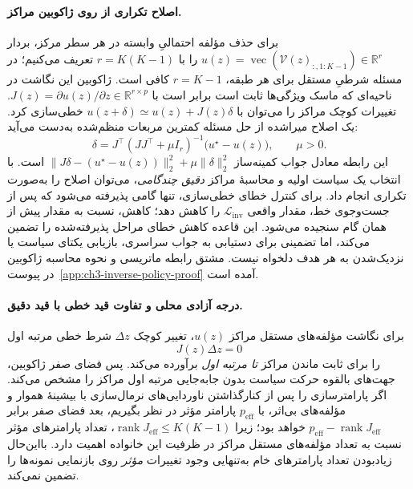 \paragraph{اصلاح تکراری از روی ژاکوبین مراکز.}
برای حذف مؤلفه احتمالیِ وابسته در هر سطر مرکز، بردار
$u(z)=\operatorname{vec}(\mathcal V(z)_{:,1:K-1})\in\mathbb R^r$
را با $r=K(K-1)$ تعریف می‌کنیم؛ در مسئله شرطیِ مستقل برای هر طبقه، $r=K-1$ کافی است. ژاکوبین این نگاشت در ناحیه‌ای که ماسک ویژگی‌ها ثابت است برابر است با
$J(z)=\partial u(z)/\partial z\in\mathbb R^{r\times p}$.
تغییرات کوچک مراکز را می‌توان با
$u(z+\delta)\simeq u(z)+J(z)\delta$
خطی‌سازی کرد. یک اصلاح میراشده از حل مسئله کمترین مربعات منظم‌شده به‌دست می‌آید:
\begin{equation}\label{cmp:eq:ch3-inverse-GN}
\boxed{\delta=
J^\top(JJ^\top+\mu I_r)^{-1}
\bigl(u^\star-u(z)\bigr),\qquad \mu>0.}
\end{equation}
این رابطه معادل جواب کمینه‌ساز
$\|J\delta-(u^\star-u(z))\|_2^2+\mu\|\delta\|_2^2$
است. با انتخاب یک سیاست اولیه و محاسبهٔ مراکز \emph{دقیق چندگامی}، می‌توان اصلاح را به‌صورت تکراری انجام داد. برای کنترل خطای خطی‌سازی، تنها گامی پذیرفته می‌شود که پس از جست‌وجوی خط، مقدار واقعی $\mathcal L_{\mathrm{inv}}$ را کاهش دهد؛ کاهش، نسبت به مقدار پیش از همان گام سنجیده می‌شود. این قاعده کاهش خطای مراحل پذیرفته‌شده را تضمین می‌کند، اما تضمینی برای دستیابی به جواب سراسری، بازیابی یکتای سیاست یا نزدیک‌شدن به هر هدف دلخواه نیست. مشتق رابطه ماتریسی و نحوه محاسبه ژاکوبین در پیوست~\ref{app:ch3-inverse-policy-proof} آمده است.


\paragraph{درجه آزادی محلی و تفاوت قید خطی با قید دقیق.}
برای نگاشت مؤلفه‌های مستقل مراکز
$u(z)$، تغییر کوچک $\Delta z$
شرط خطی مرتبه اول
\begin{equation}\label{cmp:eq:ch3-fixed-center-tangent}
\boxed{
J(z)\Delta z=0
}
\end{equation}
را برای ثابت ماندن مراکز
\emph{تا مرتبه اول} برآورده می‌کند.
پس فضای صفر ژاکوبین،
جهت‌های بالقوه حرکت سیاست
بدون جابه‌جایی مرتبه اول مراکز را
مشخص می‌کند. اگر پارامترسازی را
پس از کنارگذاشتن ناوردایی‌های
نرمال‌سازی با بیشینهٔ هموار و مؤلفه‌های بی‌اثر،
با $p_{\mathrm{eff}}$ پارامتر مؤثر
در نظر بگیریم، بعد فضای صفر
برابر $p_{\mathrm{eff}}-\operatorname{rank}J_{\mathrm{eff}}$
خواهد بود؛ زیرا
$\operatorname{rank}J_{\mathrm{eff}}\le K(K-1)$،
تعداد پارامترهای مؤثر نسبت به
تعداد مؤلفه‌های مستقل مراکز
در ظرفیت این خانواده اهمیت دارد.
بااین‌حال زیادبودن تعداد
پارامترهای خام به‌تنهایی
وجود تغییرات \emph{مؤثر}
روی بازنمایی نمونه‌ها را
تضمین نمی‌کند.

